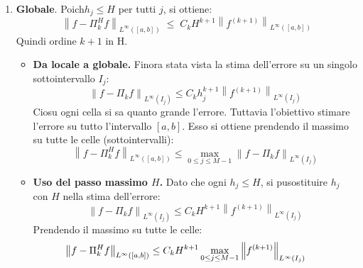 \begin{itemize}
\begin{takeawaysbox}
\begin{itemize}
\begin{enumerate}
                \item \textbf{Globale}. Poich\eaccent $h_{j} \le H$ per tutti $j$, si ottiene:
                \begin{equation*}
                    \left\| f - \Pi_{k}^{H} f \right\|_{L^{\infty}\left(\left[a,b\right]\right)} \; \le \; C_{k} H^{k+1} \left\| f^{\left(k+1\right)} \right\|_{L^{\infty}\left(\left[a,b\right]\right)}
                \end{equation*}
                Quindi ordine $k+1$ in H.

                \begin{itemize}
                    \item[\textcolor{Green3}{\faIcon{question-circle}}] \textcolor{Green3}{\textbf{Da locale a globale.}} Finora \eaccent stata vista la stima dell'errore su un singolo sottointervallo $I_{j}$:
                    \begin{equation*}
                        \left\| f - \Pi_{k} f \right\|_{L^{\infty}\left(I_{j}\right)} \le C_{k} h_{j}^{k+1} \left\| f^{(k+1)} \right\|_{L^{\infty}\left(I_{j}\right)}
                    \end{equation*}
                    Cio\eaccent su ogni cella si sa quanto \eaccent grande l'errore. Tuttavia l'obiettivo \eaccent stimare l'errore su tutto l'intervallo $\left[a,b\right]$. Esso si ottiene prendendo il massimo su tutte le celle (sottointervalli):
                    \begin{equation*}
                        \left\| f - \Pi_{k}^{H} f \right\|_{L^{\infty}\left(\left[a,b\right]\right)} \le \max_{0 \le j \le M-1} \left\| f - \Pi_{k} f \right\|_{L^{\infty}\left(I_{j}\right)}
                    \end{equation*}
                    \item[\textcolor{Green3}{\faIcon{question-circle}}] \textcolor{Green3}{\textbf{Uso del passo massimo $H$.}} Dato che ogni $h_{j} \le H$, si pu\oaccent sostituire $h_{j}$ con $H$ nella stima dell'errore:
                    \begin{equation*}
                        \left\| f - \Pi_{k} f \right\|_{L^{\infty}\left(I_{j}\right)} \le C_{k} H^{k+1} \left\| f^{(k+1)} \right\|_{L^{\infty}\left(I_{j}\right)}
                    \end{equation*}
                    Prendendo il massimo su tutte le celle:
                    \begin{equation*}
                        \hspace{-1.9em}\left\| f - \Pi_{k}^{H} f \right\|_{L^{\infty}\left(\left[a,b\right]\right)} \le C_{k} H^{k+1} \max_{0 \le j \le M-1} \left\| f^{(k+1)} \right\|_{L^{\infty}\left(I_{j}\right)}

\end{equation*}
\end{itemize}
\end{enumerate}
\end{itemize}
\end{takeawaysbox}
\end{itemize}
